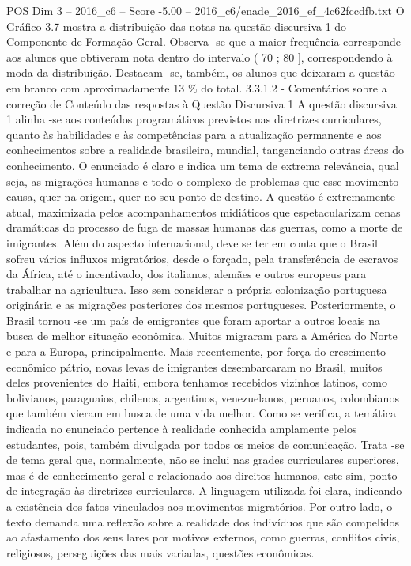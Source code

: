 \begin{textsample}{POS Dim 3 – 2016\_c6 – Score -5.00 – 2016\_c6/enade\_2016\_ef\_4c62fccdfb.txt}
O Gráfico 3.7 mostra a distribuição das notas na questão discursiva 1 do Componente de Formação Geral.
Observa -se que a maior frequência corresponde aos alunos que obtiveram nota dentro do intervalo ( 70 ; 80 ], correspondendo à moda da distribuição.
Destacam -se, também, os alunos que deixaram a questão em branco com aproximadamente 13 \% do total. 3.3.1.2 - Comentários sobre a correção de Conteúdo das respostas à Questão Discursiva 1 A questão discursiva 1 alinha -se aos conteúdos programáticos previstos nas diretrizes curriculares, quanto às habilidades e às competências para a atualização permanente e aos conhecimentos sobre a realidade brasileira, mundial, tangenciando outras áreas do conhecimento.
O enunciado é claro e indica um tema de extrema relevância, qual seja, as migrações humanas e todo o complexo de problemas que esse movimento causa, quer na origem, quer no seu ponto de destino.
A questão é extremamente atual, maximizada pelos acompanhamentos midiáticos que espetacularizam cenas dramáticas do processo de fuga de massas humanas das guerras, como a morte de imigrantes.
Além do aspecto internacional, deve se ter em conta que o Brasil sofreu vários influxos migratórios, desde o forçado, pela transferência de escravos da África, até o incentivado, dos italianos, alemães e outros europeus para trabalhar na agricultura.
Isso sem considerar a própria colonização portuguesa originária e as migrações posteriores dos mesmos portugueses.
Posteriormente, o Brasil tornou -se um país de emigrantes que foram aportar a outros locais na busca de melhor situação econômica.
Muitos migraram para a América do Norte e para a Europa, principalmente.
Mais recentemente, por força do crescimento econômico pátrio, novas levas de imigrantes desembarcaram no Brasil, muitos deles provenientes do Haiti, embora tenhamos recebidos vizinhos latinos, como bolivianos, paraguaios, chilenos, argentinos, venezuelanos, peruanos, colombianos que também vieram em busca de uma vida melhor.
Como se verifica, a temática indicada no enunciado pertence à realidade conhecida amplamente pelos estudantes, pois, também divulgada por todos os meios de comunicação.
Trata -se de tema geral que, normalmente, não se inclui nas grades curriculares superiores, mas é de conhecimento geral e relacionado aos direitos humanos, este sim, ponto de integração às diretrizes curriculares.
A linguagem utilizada foi clara, indicando a existência dos fatos vinculados aos movimentos migratórios.
Por outro lado, o texto demanda uma reflexão sobre a realidade dos indivíduos que são compelidos ao afastamento dos seus lares por motivos externos, como guerras, conflitos civis, religiosos, perseguições das mais variadas, questões econômicas.

\end{textsample}
